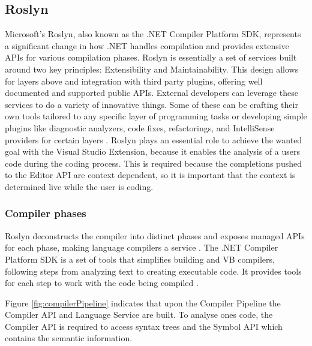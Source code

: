 \subsection{Roslyn}
\label{ssec:RoslynArchitecture}
Microsoft's Roslyn, also known as the .NET Compiler Platform SDK, represents a significant change in how .NET handles compilation and provides extensive APIs for various compilation phases. Roslyn is essentially a set of services built around two key principles: Extensibility and Maintainability. This design allows for layers above and integration with third party plugins, offering well documented and supported public APIs. External developers can leverage these services to do a variety of innovative things. Some of these can be crafting their own tools tailored to any specific layer of programming tasks or
developing simple plugins like diagnostic analyzers, code fixes, refactorings, and IntelliSense providers for certain layers \citep{vasani2017roslyn}. Roslyn plays an essential role to achieve the wanted goal with the Visual Studio Extension, because it enables the analysis of a users code during the coding process. This is required because the completions pushed to the Editor API are context dependent, so it is important that the context is determined live while the user is coding.

\subsubsection{Compiler phases}
\label{sssec:RoslynCompilerPhases}
Roslyn deconstructs the compiler into distinct phases and exposes managed APIs for each phase, making language compilers a service \citep{roslynIntroduction}. The .NET Compiler Platform SDK is a set of tools that simplifies building \csharp and VB compilers, following steps from analyzing text to creating executable code. It provides tools for each step to work with the code being compiled \citep{dotnetCompilerPlatformSDK}.


Figure \ref{fig:compilerPipeline} indicates that upon the Compiler Pipeline the Compiler API and Language Service are built. To analyse ones code, the Compiler API is required to access syntax trees and the Symbol API which contains the semantic information.

